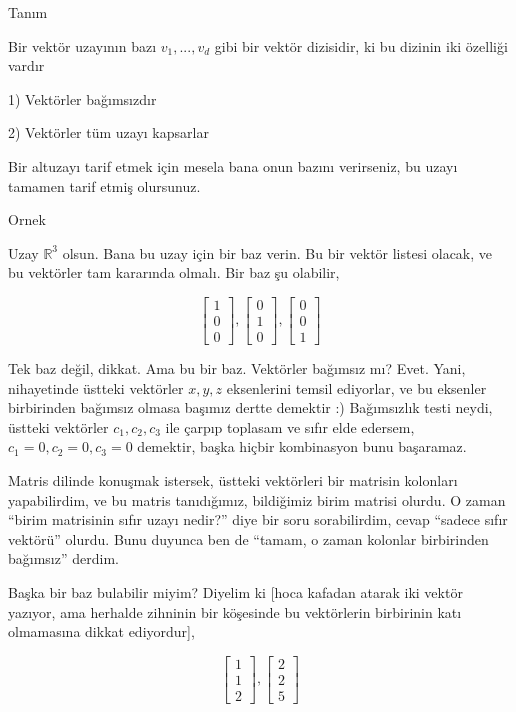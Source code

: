 \documentclass[12pt,fleqn]{article}\usepackage{../../common}
\begin{document}
Tanım

Bir vektör uzayının bazı $v_1,...,v_d$ gibi bir vektör dizisidir, ki bu
dizinin iki özelliği vardır

1) Vektörler bağımsızdır

2) Vektörler tüm uzayı kapsarlar

Bir altuzayı tarif etmek için mesela bana onun bazını verirseniz, bu uzayı
tamamen tarif etmiş olursunuz. 

Ornek

Uzay $\mathbb{R}^3$ olsun. Bana bu uzay için bir baz verin. Bu bir vektör
listesi olacak, ve bu vektörler tam kararında olmalı. Bir baz şu olabilir, 

$$ 
\left[\begin{array}{r}
1 \\ 0 \\ 0 
\end{array}\right],
\left[\begin{array}{r}
0 \\ 1 \\ 0 
\end{array}\right],
\left[\begin{array}{r}
0 \\ 0 \\ 1 
\end{array}\right]
 $$

Tek baz değil, dikkat. Ama bu bir baz. Vektörler bağımsız mı? Evet. Yani,
nihayetinde üstteki vektörler $x,y,z$ eksenlerini temsil ediyorlar, ve bu
eksenler birbirinden bağımsız olmasa başımız dertte demektir :) Bağımsızlık
testi neydi, üstteki vektörler $c_1,c_2,c_3$ ile çarpıp toplasam ve sıfır
elde edersem, $c_1=0,c_2=0,c_3=0$ demektir, başka hiçbir kombinasyon bunu
başaramaz.  

Matris dilinde konuşmak istersek, üstteki vektörleri bir matrisin kolonları
yapabilirdim, ve bu matris tanıdığımız, bildiğimiz birim matrisi olurdu. O
zaman ``birim matrisinin sıfır uzayı nedir?'' diye bir soru sorabilirdim,
cevap ``sadece sıfır vektörü'' olurdu. Bunu duyunca ben de ``tamam, o zaman
kolonlar birbirinden bağımsız'' derdim. 

Başka bir baz bulabilir miyim? Diyelim ki [hoca kafadan atarak iki vektör
yazıyor, ama herhalde zihninin bir köşesinde bu vektörlerin birbirinin katı
olmamasına dikkat ediyordur],

$$ 
\left[\begin{array}{r}
1 \\ 1 \\ 2 
\end{array}\right],
\left[\begin{array}{r}
2 \\ 2 \\ 5 
\end{array}\right]
 $$
\end{document}

